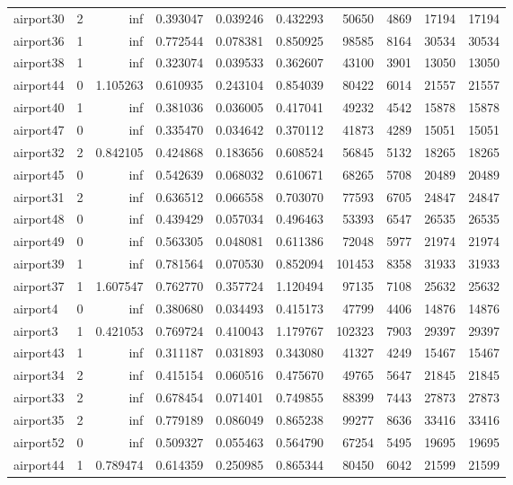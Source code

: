 \begin{longtable}{|l|r|r|r|r|r|r|r|r|r|}
airport30 & 2 & inf & 0.393047 & 0.039246 & 0.432293 & 50650 & 4869 & 17194 & 17194 \\
airport36 & 1 & inf & 0.772544 & 0.078381 & 0.850925 & 98585 & 8164 & 30534 & 30534 \\
airport38 & 1 & inf & 0.323074 & 0.039533 & 0.362607 & 43100 & 3901 & 13050 & 13050 \\
airport44 & 0 & 1.105263 & 0.610935 & 0.243104 & 0.854039 & 80422 & 6014 & 21557 & 21557 \\
airport40 & 1 & inf & 0.381036 & 0.036005 & 0.417041 & 49232 & 4542 & 15878 & 15878 \\
airport47 & 0 & inf & 0.335470 & 0.034642 & 0.370112 & 41873 & 4289 & 15051 & 15051 \\
airport32 & 2 & 0.842105 & 0.424868 & 0.183656 & 0.608524 & 56845 & 5132 & 18265 & 18265 \\
airport45 & 0 & inf & 0.542639 & 0.068032 & 0.610671 & 68265 & 5708 & 20489 & 20489 \\
airport31 & 2 & inf & 0.636512 & 0.066558 & 0.703070 & 77593 & 6705 & 24847 & 24847 \\
airport48 & 0 & inf & 0.439429 & 0.057034 & 0.496463 & 53393 & 6547 & 26535 & 26535 \\
airport49 & 0 & inf & 0.563305 & 0.048081 & 0.611386 & 72048 & 5977 & 21974 & 21974 \\
airport39 & 1 & inf & 0.781564 & 0.070530 & 0.852094 & 101453 & 8358 & 31933 & 31933 \\
airport37 & 1 & 1.607547 & 0.762770 & 0.357724 & 1.120494 & 97135 & 7108 & 25632 & 25632 \\
airport4 & 0 & inf & 0.380680 & 0.034493 & 0.415173 & 47799 & 4406 & 14876 & 14876 \\
airport3 & 1 & 0.421053 & 0.769724 & 0.410043 & 1.179767 & 102323 & 7903 & 29397 & 29397 \\
airport43 & 1 & inf & 0.311187 & 0.031893 & 0.343080 & 41327 & 4249 & 15467 & 15467 \\
airport34 & 2 & inf & 0.415154 & 0.060516 & 0.475670 & 49765 & 5647 & 21845 & 21845 \\
airport33 & 2 & inf & 0.678454 & 0.071401 & 0.749855 & 88399 & 7443 & 27873 & 27873 \\
airport35 & 2 & inf & 0.779189 & 0.086049 & 0.865238 & 99277 & 8636 & 33416 & 33416 \\
airport52 & 0 & inf & 0.509327 & 0.055463 & 0.564790 & 67254 & 5495 & 19695 & 19695 \\
airport44 & 1 & 0.789474 & 0.614359 & 0.250985 & 0.865344 & 80450 & 6042 & 21599 & 21599 \\

\end{longtable}
